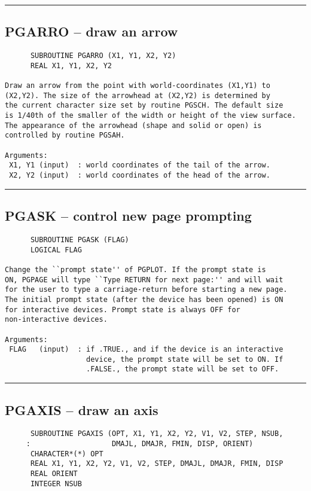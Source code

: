 {\small
\hrule


\subsection*{PGARRO -- draw an arrow }
\begin{verbatim}
      SUBROUTINE PGARRO (X1, Y1, X2, Y2)
      REAL X1, Y1, X2, Y2

Draw an arrow from the point with world-coordinates (X1,Y1) to 
(X2,Y2). The size of the arrowhead at (X2,Y2) is determined by 
the current character size set by routine PGSCH. The default size 
is 1/40th of the smaller of the width or height of the view surface.
The appearance of the arrowhead (shape and solid or open) is
controlled by routine PGSAH.

Arguments:
 X1, Y1 (input)  : world coordinates of the tail of the arrow.
 X2, Y2 (input)  : world coordinates of the head of the arrow.
\end{verbatim}
\hrule


\subsection*{PGASK -- control new page prompting }
\begin{verbatim}
      SUBROUTINE PGASK (FLAG)
      LOGICAL FLAG

Change the ``prompt state'' of PGPLOT. If the prompt state is
ON, PGPAGE will type ``Type RETURN for next page:'' and will wait
for the user to type a carriage-return before starting a new page.
The initial prompt state (after the device has been opened) is ON
for interactive devices. Prompt state is always OFF for
non-interactive devices.

Arguments:
 FLAG   (input)  : if .TRUE., and if the device is an interactive
                   device, the prompt state will be set to ON. If
                   .FALSE., the prompt state will be set to OFF.
\end{verbatim}
\hrule


\subsection*{PGAXIS -- draw an axis }
\begin{verbatim}
      SUBROUTINE PGAXIS (OPT, X1, Y1, X2, Y2, V1, V2, STEP, NSUB,
     :                   DMAJL, DMAJR, FMIN, DISP, ORIENT)
      CHARACTER*(*) OPT
      REAL X1, Y1, X2, Y2, V1, V2, STEP, DMAJL, DMAJR, FMIN, DISP
      REAL ORIENT
      INTEGER NSUB


\end{verbatim}}
